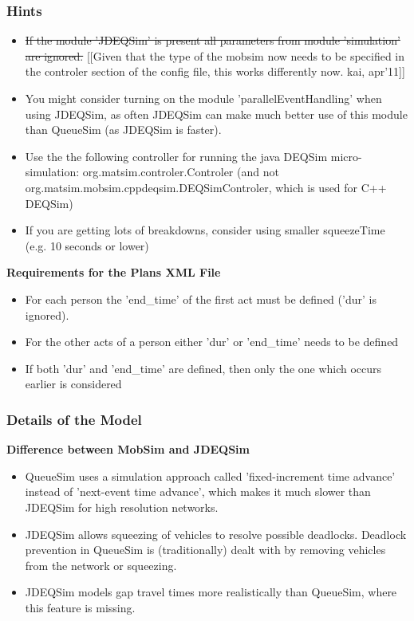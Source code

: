\documentclass[a4paper,11pt]{report}
\begin{document}
\subsubsection{Hints}
\begin{itemize}
	\item \sout{If the module 'JDEQSim' is present all parameters from module 'simulation' are ignored.}  [[Given that the type of the mobsim now needs to be specified in the  controler section of the config file, this works differently now.  kai, apr'11]]
	\item You might consider turning on the module  'parallelEventHandling' when using JDEQSim, as often JDEQSim can make  much better use of this module than QueueSim (as JDEQSim is faster).
	\item Use  the the following controller for running the java DEQSim  micro-simulation: org.matsim.controler.Controler (and not  org.matsim.mobsim.cppdeqsim.DEQSimControler, which is used for C++  DEQSim)
\\
	\item If you are getting lots of breakdowns, consider using smaller squeezeTime (e.g. 10 seconds or lower)
\end{itemize}

\textbf{Requirements for the Plans XML File
\\}
\begin{itemize}
	\item For each person the 'end\_time' of the first act must be defined ('dur' is ignored).
	\item For the other acts of a person either 'dur' or 'end\_time' needs to be defined
	\item If both 'dur' and 'end\_time' are defined, then only the one which occurs earlier is considered
\end{itemize}

\subsubsection{Details of the Model}

\textbf{Difference between MobSim and JDEQSim}
\begin{itemize}
	\item QueueSim  uses a simulation approach called 'fixed-increment time advance'  instead of 'next-event time advance', which makes it much slower than  JDEQSim for high resolution networks.
	\item JDEQSim allows  squeezing of vehicles to resolve possible deadlocks. Deadlock prevention  in QueueSim is (traditionally) dealt with by removing vehicles from the  network or squeezing.
	\item JDEQSim models gap travel times more realistically than QueueSim, where this feature is missing.
\end{itemize}
\end{document}
